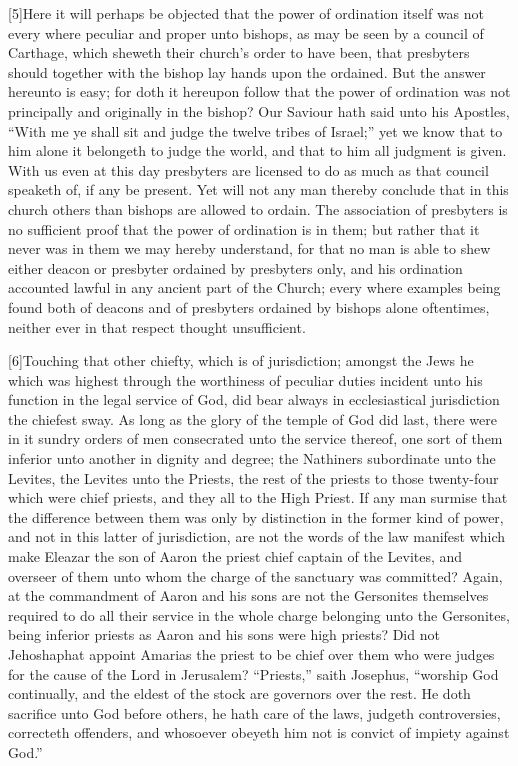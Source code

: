 [5]Here it will perhaps be objected that the power of ordination itself was not every where peculiar and proper unto bishops, as may be seen by a council of Carthage, which sheweth their church’s order to have been, that presbyters should together with the bishop lay hands upon the ordained. But the answer hereunto is easy; for doth it hereupon follow that the power of ordination was not principally and originally in the bishop? Our Saviour hath said unto his Apostles, “With me ye shall sit and judge the twelve tribes of Israel;” yet we know that to him alone it belongeth to judge the world, and that to him all judgment is given. With us even at this day presbyters are licensed to do as much as that council speaketh of, if any be present. Yet will not any man thereby conclude that in this church others than bishops are allowed to ordain. The association of presbyters is no sufficient proof that the power of ordination is in them; but rather that it never was in them we may hereby understand, for that no man is able to shew either deacon or presbyter ordained by presbyters only, and his ordination accounted lawful in any ancient part of the Church; every where examples being found both of deacons and of presbyters ordained by bishops alone oftentimes, neither ever in that respect thought unsufficient.

[6]Touching that other chiefty, which is of jurisdiction; amongst the Jews he which was highest through the worthiness of peculiar duties incident unto his function in the legal service of God, did bear always in ecclesiastical jurisdiction the chiefest sway. As long as the glory of the temple of God did last, there were in it sundry orders of men consecrated  unto the service thereof,
 one sort of them inferior unto another in dignity and degree; the Nathiners subordinate unto the Levites, the Levites unto the Priests, the rest of the priests to those twenty-four which were chief priests, and they all to the High Priest. If any man surmise that the difference between them was only by distinction in the former kind of power, and not in this latter of jurisdiction, are not the words of the law manifest which make Eleazar the son of Aaron the priest chief captain of the Levites, and overseer of them unto whom the charge of the sanctuary was committed? Again, at the commandment of Aaron and his sons are not the Gersonites themselves required to do all their service in the whole charge belonging unto the Gersonites, being inferior priests as Aaron and his sons were high priests? Did not Jehoshaphat appoint Amarias the priest to be chief over them who were judges for the cause of the Lord in Jerusalem? “Priests,” saith Josephus, “worship God continually, and the eldest of the stock are governors over the rest. He doth sacrifice unto God before others, he hath care of the laws, judgeth controversies, correcteth offenders, and whosoever obeyeth him not is convict of impiety against God.”


